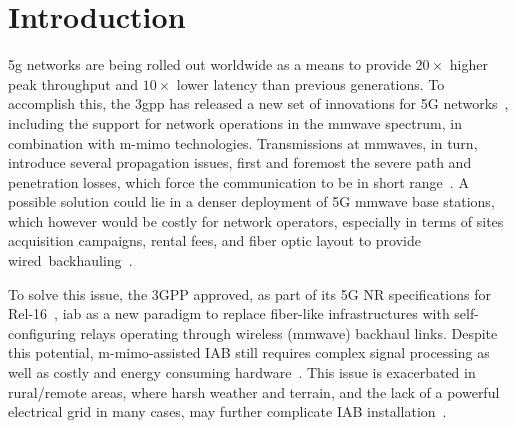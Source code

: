 \def\si{\tikz\fill[scale=0.4](0,.35) -- (.25,0) -- (1,.7) -- (.25,.15) -- cycle;}

    

\section{Introduction}
\label{sec:intro}


\Gls{5g} networks are being rolled out worldwide 
as a means to provide $20\times$ higher peak throughput and $10\times$ lower latency than previous generations.
To accomplish this, the \gls{3gpp} has released a new set of innovations for 5G networks~\cite{38300}, including the support for network operations in the \gls{mmwave} spectrum, in combination with \gls{m-mimo} technologies.
Transmissions at \glspl{mmwave}, in turn, introduce several propagation issues, first and foremost the severe path and penetration losses, which force the communication to be in short range~\cite{rangan2017potentials}.
A possible solution could lie in a denser deployment of 5G \gls{mmwave} base stations, which however would be costly for network operators, especially in terms of sites acquisition campaigns, rental fees, and fiber optic layout to provide wired~backhauling~\cite{lopez2015towards}. 


To solve this issue, the 3GPP approved, as part of its 5G NR specifications for Rel-16~\cite{38874}, \gls{iab} as a new paradigm to replace fiber-like infrastructures with self-configuring relays operating through wireless (\gls{mmwave}) backhaul links.
Despite this potential, \mbox{\gls{m-mimo}-assisted} IAB still requires complex signal processing as well as costly and energy consuming hardware~\cite{polese2020integrated}.
This issue is exacerbated in rural/remote areas, where harsh weather and terrain, and the lack of a powerful electrical grid in many cases, may further complicate IAB installation~\cite{chaoub20216g		}.

